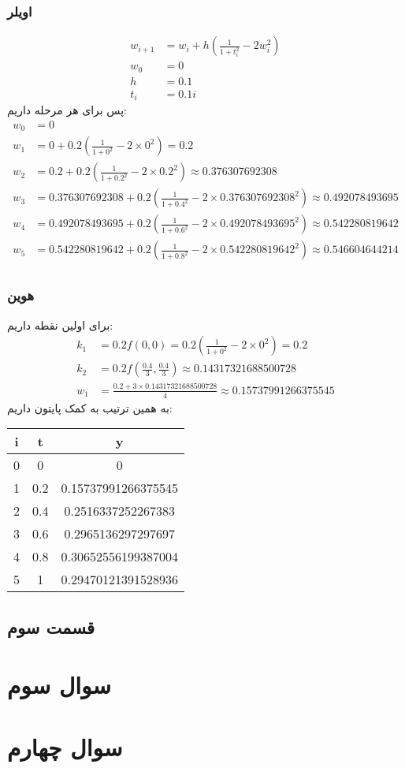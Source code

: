 \documentclass[]{article}
\begin{document}
\subsubsection*{اویلر}
\begin{align*}
    w_{i+1} &= w_i + h\left(\frac{1}{1+t_i^2}-2w_i^2\right)\\
    w_0 &= 0\\
    h &= 0.1\\
    t_i &= 0.1i
\end{align*}
پس برای هر مرحله داریم:
\begin{align*}
    w_0 &= 0\\
    w_1 &= 0 + 0.2\left(\frac{1}{1+0^2}-2 \times 0^2\right) = 0.2\\
    w_2 &= 0.2 + 0.2\left(\frac{1}{1+0.2^2}-2\times 0.2^2\right) \approx 0.376307692308\\
    w_3 &= 0.376307692308 + 0.2\left(\frac{1}{1+0.4^2}-2\times0.376307692308^2\right) \approx 0.492078493695\\
    w_4 &= 0.492078493695 + 0.2\left(\frac{1}{1+0.6^2}-2\times0.492078493695^2\right) \approx 0.542280819642\\
    w_5 &= 0.542280819642 + 0.2\left(\frac{1}{1+0.8^2}-2\times0.542280819642^2\right) \approx 0.546604644214\\
\end{align*}
\subsubsection*{هوین}
برای اولین نقطه داریم:
\begin{align*}
    k_1 &= 0.2 f(0, 0) = 0.2\left(\frac{1}{1+0^2}-2 \times 0^2\right) = 0.2\\
    k_2 &= 0.2 f(\frac{0.4}{3}, \frac{0.4}{3}) \approx 0.14317321688500728\\
    w_1 &= \frac{0.2 + 3 \times 0.14317321688500728}{4} \approx 0.15737991266375545
\end{align*}
به همین ترتیب به کمک پایتون داریم:
\begin{latin}
    \centering
    \begin{tabular}{c|c|c}
        i & t & y\\
        \hline
        0 & 0 & 0\\
        1 & 0.2 & 0.15737991266375545\\
        2 & 0.4 & 0.2516337252267383\\
        3 & 0.6 & 0.2965136297297697\\
        4 & 0.8 & 0.30652556199387004\\
        5 & 1 & 0.29470121391528936\\
    \end{tabular}
\end{latin}
\subsection*{قسمت سوم}
\section*{سوال سوم}
\section*{سوال چهارم}
\end{document}
